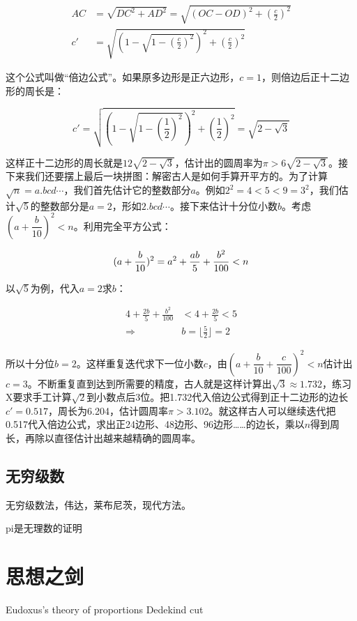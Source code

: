\documentclass[b5paper]{ctexart}
\begin{document}
\begin{align}
AC &= \sqrt{DC^2 + AD^2} = \sqrt{(OC - OD)^2 + (\frac{c}{2})^2}  \\
c' &= \sqrt{(1 - \sqrt{1 - (\frac{c}{2})^2})^2 + (\frac{c}{2})^2}
\label{eq:double-edges}
\end{align}

这个公式叫做“倍边公式”。如果原多边形是正六边形，$c = 1$，则倍边后正十二边形的周长是：

\[
c' = \sqrt{(1 - \sqrt{1 - (\frac{1}{2})^2})^2 + (\frac{1}{2})^2} = \sqrt{2 - \sqrt{3}}
\]

这样正十二边形的周长就是$12\sqrt{2 - \sqrt{3}}$，估计出的圆周率为$\pi > 6\sqrt{2 - \sqrt{3}}$。接下来我们还要摆上最后一块拼图：解密古人是如何手算开平方的。为了计算$\sqrt{n} = a.bcd\dotsm$，我们首先估计它的整数部分$a$。例如$2^2 = 4 < 5 < 9 = 3^2$，我们估计$\sqrt{5}$的整数部分是$a = 2$，形如$2.bcd\dotsm$。接下来估计十分位小数$b$。考虑$(a + \dfrac{b}{10})^2 < n$。利用完全平方公式：

\[
(a + \frac{b}{10})^2 = a^2 + \frac{ab}{5} + \frac{b^2}{100}  < n \\
\]

以$\sqrt{5}$为例，代入$a = 2$求$b$：

\begin{align*}
4 + \frac{2b}{5} + \frac{b^2}{100} &< 4 + \frac{2b}{5} < 5 \\
 \Rightarrow & b = \lfloor \frac{5}{2} \rfloor = 2
\end{align*}

所以十分位$b = 2$。这样重复迭代求下一位小数$c$，由$(a + \dfrac{b}{10} + \dfrac{c}{100})^2 < n$估计出$c = 3$。不断重复直到达到所需要的精度，古人就是这样计算出$\sqrt{3} \approx 1.732$，练习X要求手工计算$\sqrt{2}$到小数点后3位。把1.732代入倍边公式得到正十二边形的边长$c' = 0.517$，周长为6.204，估计圆周率$\pi > 3.102$。就这样古人可以继续迭代把0.517代入倍边公式，求出正24边形、48边形、96边形……的边长，乘以$n$得到周长，再除以直径估计出越来越精确的圆周率。

\subsection{无穷级数}
无穷级数法，伟达，莱布尼茨，现代方法。

pi是无理数的证明

\section{思想之剑}
Eudoxus's theory of proportions
Dedekind cut
\end{document}
